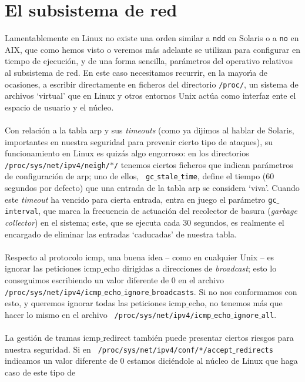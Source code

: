 \section{El subsistema de red}
\label{linux_netsys}
Lamentablemente en Linux no existe una orden similar a {\tt ndd} en Solaris o a
{\tt no} en AIX, que como hemos visto o veremos m\'as adelante se utilizan para
configurar en tiempo de ejecuci\'on, y de una forma sencilla, par\'ametros del 
operativo relativos al subsistema de red. En este caso necesitamos recurrir, en
la mayor\'{\i}a de ocasiones, a escribir directamente en ficheros del directorio
{\tt /proc/}, un sistema de archivos `virtual' que en Linux y otros entornos 
Unix act\'ua como interfaz ente el espacio de usuario y el n\'ucleo.\\
\\Con relaci\'on a la tabla {\sc arp} y sus {\it timeouts} (como ya dijimos al
hablar de Solaris, importantes en nuestra seguridad para prevenir cierto tipo de
ataques), su funcionamiento en Linux es quiz\'as algo engorroso: en los
directorios {\tt /proc/sys/net/ipv4/neigh/$\ast$/} tenemos ciertos ficheros que
indican par\'ametros de configuraci\'on de {\sc arp}; uno de ellos, {\tt
gc$\_$stale$\_$time}, define el tiempo (60 segundos por defecto) que una entrada
de la tabla {\sc arp} se considera `viva'. Cuando este {\it timeout} ha vencido
para cierta entrada, entra en juego el par\'ametro {\tt gc$\_$interval}, que
marca la frecuencia de actuaci\'on del recolector de basura ({\it garbage 
collector}) en el sistema; este, que se ejecuta cada 30 segundos, es realmente 
el encargado de eliminar las entradas `caducadas' de nuestra tabla.\\
\\Respecto al protocolo {\sc icmp}, una buena idea -- como en cualquier Unix --
es ignorar las peticiones {\sc icmp$\_$echo} dirigidas a direcciones de {\it
broadcast}; esto lo conseguimos escribiendo un valor diferente de 0 en el 
archivo {\tt /proc/sys/net/ipv4/icmp$\_$echo$\_$ignore$\_$broadcasts}. Si no nos
conformamos con esto, y queremos ignorar todas las peticiones {\sc 
icmp$\_$echo}, no tenemos m\'as que hacer lo mismo en el archivo {\tt 
/proc/sys/net/ipv4/icmp$\_$echo$\_$ignore$\_$all}.\\
\\La gesti\'on de tramas {\sc icmp$\_$redirect} tambi\'en puede presentar 
ciertos riesgos para nuestra seguridad. Si en {\tt 
/proc/sys/net/ipv4/conf/*/accept$\_$redirects} indicamos un valor diferente de
0 estamos dici\'endole al n\'ucleo de Linux que haga caso de este tipo de 
